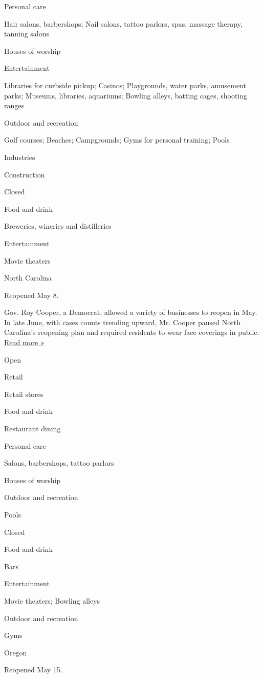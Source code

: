 Personal care

Hair salons, barbershops; Nail salons, tattoo parlors, spas, massage
therapy, tanning salons

Houses of worship

Entertainment

Libraries for curbside pickup; Casinos; Playgrounds, water parks,
amusement parks; Museums, libraries, aquariums; Bowling alleys, batting
cages, shooting ranges

Outdoor and recreation

Golf courses; Beaches; Campgrounds; Gyms for personal training; Pools

Industries

Construction

Closed

Food and drink

Breweries, wineries and distilleries

Entertainment

Movie theaters

North Carolina

Reopened May 8.

Gov. Roy Cooper, a Democrat, allowed a variety of businesses to reopen
in May. In late June, with cases counts trending upward, Mr. Cooper
paused North Carolina's reopening plan and required residents to wear
face coverings in public.
\href{https://www.newsobserver.com/news/coronavirus/article244212852.html}{Read
more »}

Open

Retail

Retail stores

Food and drink

Restaurant dining

Personal care

Salons, barbershops, tattoo parlors

Houses of worship

Outdoor and recreation

Pools

Closed

Food and drink

Bars

Entertainment

Movie theaters; Bowling alleys

Outdoor and recreation

Gyms

Oregon

Reopened May 15.

